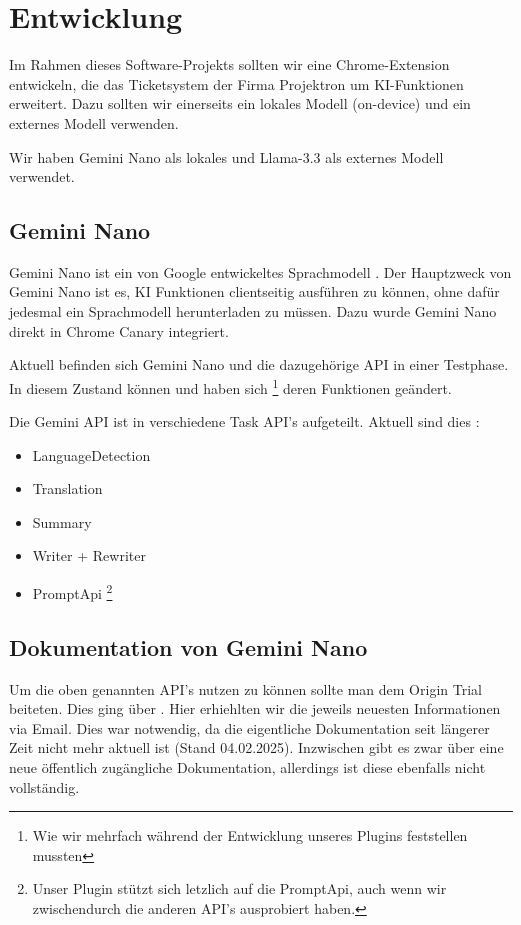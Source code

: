 \section{Entwicklung}

Im Rahmen dieses Software-Projekts sollten wir eine Chrome-Extension entwickeln, die das Ticketsystem der Firma Projektron um KI-Funktionen erweitert. Dazu sollten wir einerseits ein lokales Modell (on-device) und ein externes Modell verwenden.

Wir haben Gemini Nano als lokales und Llama-3.3 als externes Modell verwendet.

\subsection{Gemini Nano}

Gemini Nano ist ein von Google entwickeltes Sprachmodell \cite{gemini-nano}. Der Hauptzweck von Gemini Nano ist es, KI Funktionen clientseitig ausführen zu können, ohne dafür jedesmal ein Sprachmodell herunterladen zu müssen. Dazu wurde Gemini Nano direkt in Chrome Canary integriert. \cite{gemini-nano-build-in-ai}

Aktuell befinden sich Gemini Nano und die dazugehörige API in einer Testphase. In diesem Zustand können und haben sich \footnote{Wie wir mehrfach während der Entwicklung unseres Plugins feststellen mussten} deren Funktionen geändert. \cite{gemini-nano-build-in-ai}

Die Gemini API ist in verschiedene Task API's aufgeteilt. Aktuell sind dies \cite{gemini-nano-apis}:
\begin{itemize}
    \item LanguageDetection
    \item Translation
    \item Summary
    \item Writer + Rewriter
    \item PromptApi \footnote{Unser Plugin stützt sich letzlich auf die PromptApi, auch wenn wir zwischendurch die anderen API's ausprobiert haben.}
\end{itemize} 

\subsection{Dokumentation von Gemini Nano}

Um die oben genannten API's nutzen zu können sollte man dem Origin Trial beiteten. Dies ging über \cite{gemini-nano-origin-trial}. Hier erhiehlten wir die jeweils neuesten Informationen via Email. Dies war notwendig, da die eigentliche Dokumentation \cite{old-doku-language-detection-api, old-doku-translation-api,old-doku-summarization-api,old-doku-writer-api,old-doku-prompt-api} seit längerer Zeit nicht mehr aktuell ist (Stand 04.02.2025). Inzwischen gibt es zwar über \cite{gemini-nano-build-in-ai} eine neue öffentlich zugängliche Dokumentation, allerdings ist diese ebenfalls nicht vollständig.

